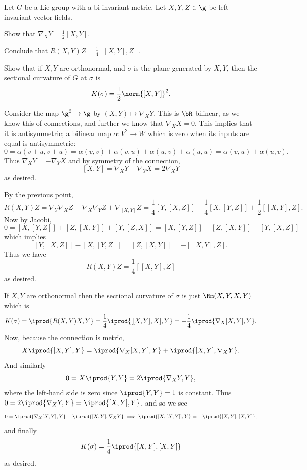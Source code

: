 \bprob[title={DoCarmo, Riemannian Geometry, page 103 question 1}]

    Let $G$ be a Lie group with a bi-invariant metric.
    Let $X,Y,Z\in\g$ be left-invariant vector fields.
    \benum
        \item Show that $\nabla_XY=\frac12[X,Y]$.
        \item Conclude that $R(X,Y)Z=\frac14[[X,Y],Z]$.
        \item Show that if $X,Y$ are orthonormal, and $\sigma$ is the plane generated by $X,Y$, then the sectional curvature of $G$ at $\sigma$ is
        $$ K(\sigma) = \frac12\norm{[X,Y]}^2 . $$
    \eenum

\eprob

\benum
    \item Consider the map $\g^2\to\g$ by $(X,Y)\mapsto\nabla_XY$.
    This is $\bR$-bilinear, as we know this of connections, and further we know that $\nabla_XX=0$.
    This implies that it is antisymmetric; a bilinear map $\alpha\colon V^2\to W$ which is zero when its inputs are equal is antisymmetric:
    $$ 0 = \alpha(v+u,v+u) = \alpha(v,v) + \alpha(v,u) + \alpha(u,v) + \alpha(u,u) = \alpha(v,u) + \alpha(u,v) . $$
    Thus $\nabla_XY=-\nabla_YX$ and by symmetry of the connection,
    $$ [X,Y] = \nabla_XY - \nabla_YX = 2\nabla_XY $$
    as desired.

    \item By the previous point,
    $$ R(X,Y)Z = \nabla_Y\nabla_XZ - \nabla_X\nabla_YZ + \nabla_{[X,Y]}Z = \frac14[Y,[X,Z]] - \frac14[X,[Y,Z]] + \frac12[[X,Y],Z] . $$
    Now by Jacobi,
    $$ 0 = [X,[Y,Z]] + [Z,[X,Y]] + [Y,[Z,X]] = [X,[Y,Z]] + [Z,[X,Y]] - [Y,[X,Z]] $$
    which implies
    $$ [Y,[X,Z]] - [X,[Y,Z]] = [Z,[X,Y]] = -[[X,Y],Z] . $$
    Thus we have
    $$ R(X,Y)Z = \frac14[[X,Y],Z] $$
    as desired.

    \item If $X,Y$ are orthonormal then the sectional curvature of $\sigma$ is just $\Rm(X,Y,X,Y)$ which is
    $$ K(\sigma) = \iprod{R(X,Y)X,Y} = \frac14\iprod{[[X,Y],X],Y} = -\frac14\iprod{\nabla_X[X,Y],Y} . $$
    Now, because the connection is metric,
    $$ X\iprod{[X,Y],Y} = \iprod{\nabla_X[X,Y],Y} + \iprod{[X,Y],\nabla_XY} . $$
    And similarly
    $$ 0 = X\iprod{Y,Y} = 2\iprod{\nabla_XY,Y} , $$
    where the left-hand side is zero since $\iprod{Y,Y}=1$ is constant.
    Thus $0=2\iprod{\nabla_XY,Y}=\iprod{[X,Y],Y}$, and so we see
    $$ 0 = \iprod{\nabla_X[X,Y],Y} + \iprod{[X,Y],\nabla_XY} \implies \iprod{[X,[X,Y]],Y} = -\iprod{[X,Y],[X,Y]} , $$
    and finally
    $$ K(\sigma) = \frac14\iprod{[X,Y],[X,Y]} $$
    as desired.
\eenum

